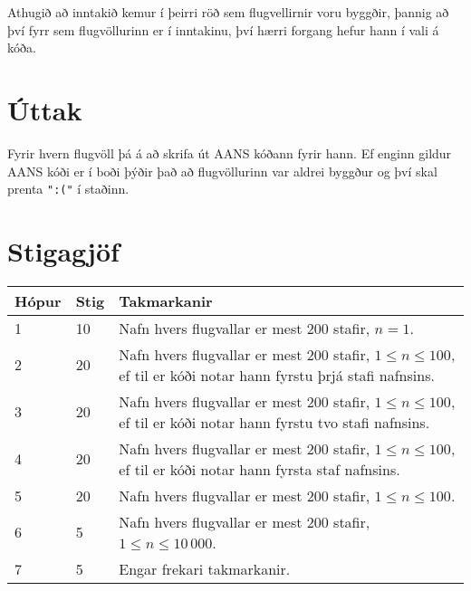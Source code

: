 Athugið að inntakið kemur í þeirri röð sem flugvellirnir voru byggðir, þannig að því fyrr sem flugvöllurinn er í inntakinu, því hærri forgang hefur hann í vali á kóða.

\section*{Úttak}
Fyrir hvern flugvöll þá á að skrifa út AANS kóðann fyrir hann.
Ef enginn gildur AANS kóði er í boði þýðir það að flugvöllurinn var aldrei byggður og því skal prenta \texttt{":("} í staðinn.

\section*{Stigagjöf}
\begin{tabular}{|l|l|l|}
\hline
Hópur & Stig & Takmarkanir \\ \hline
1     & 10   & Nafn hvers flugvallar er mest $200$ stafir, $n = 1$. \\ \hline
2     & 20   & Nafn hvers flugvallar er mest $200$ stafir, $1 \leq n \leq 100$, ef til er kóði notar hann fyrstu þrjá stafi nafnsins. \\ \hline
3     & 20   & Nafn hvers flugvallar er mest $200$ stafir, $1 \leq n \leq 100$, ef til er kóði notar hann fyrstu tvo stafi nafnsins. \\ \hline
4     & 20   & Nafn hvers flugvallar er mest $200$ stafir, $1 \leq n \leq 100$, ef til er kóði notar hann fyrsta staf nafnsins. \\ \hline
5     & 20   & Nafn hvers flugvallar er mest $200$ stafir, $1 \leq n \leq 100$. \\ \hline
6     & 5    & Nafn hvers flugvallar er mest $200$ stafir, $1 \leq n \leq 10 \, 000$. \\ \hline
7     & 5    & Engar frekari takmarkanir. \\ \hline
\end{tabular}
